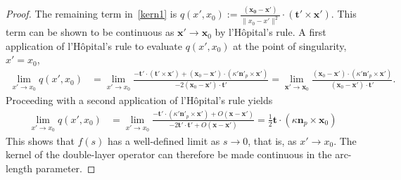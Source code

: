\documentclass[final]{siamltex}
\begin{document}
\begin{proof}
 


The remaining term in~\eqref{kern1} is 
$
 q(x',x_0) := 
    \frac{(\mathbf{x_0}-\mathbf{x'})}{\|{x_0}-{x'}\|^2}
    \cdot \left( \mathbf{t}' \times {\mathbf x}' \right).
$
This term can be shown to be continuous as ${\mathbf x}' \rightarrow {\mathbf x_0}$ by l'H\^{o}pital's rule. 
A first application of l'H\^{o}pital's rule to evaluate $q(x',x_0)$ at the point of singularity, ${ x}' = { x_0}$, 
\begin{align*}
   \lim_{{ x}' \rightarrow { x_0}}q(x',x_0) 
      & = \lim_{{ x}' \rightarrow { x_0}}  \frac{ -\mathbf{t}' \cdot \left( \mathbf{t}' \times {\mathbf x}' \right) 
                                                             + ({\mathbf x_0}-{\mathbf x}') \cdot \left( \kappa' {\mathbf n}'_p \times {\mathbf x}'  \right)}
                                                           { -2 ({\mathbf x_0} - {\mathbf x}') \cdot \mathbf{t}' } =  \lim_{{\mathbf x}' \rightarrow {\mathbf x_0}}  \frac{  ({\mathbf x_0}-{\mathbf x}') \cdot \left( \kappa' {\mathbf n}'_p \times {\mathbf x}'  \right)}
                                                           { ({\mathbf x_0} - {\mathbf x}') \cdot \mathbf{t}' }. 
\end{align*}
Proceeding with a second application of l'H\^{o}pital's rule yields
\begin{align*}
   \lim_{{ x}' \rightarrow { x_0}} q(x',x_0)  
      & =   \lim_{{ x}' \rightarrow { x_0}}  \frac{  -\mathbf{t'} \cdot 
                                                                 \left( \kappa' {\mathbf n}'_p \times {\mathbf x}'  \right) + O({\mathbf x}-{\mathbf x}')}
                                                           { -2{\mathbf t}' \cdot \mathbf{t}' + O({\mathbf x}-{\mathbf x}')}  = \frac{1}{2} \mathbf{t} \cdot  \left( \kappa {\mathbf n}_p \times {\mathbf x_0}  \right) 
\end{align*}
This shows that $f(s)$ has a well-defined limit as $s\rightarrow 0$, that is, as $x'\rightarrow x_0$. The kernel of the double-layer operator can therefore be made continuous in the arc-length parameter.


\end{proof}
\end{document}
